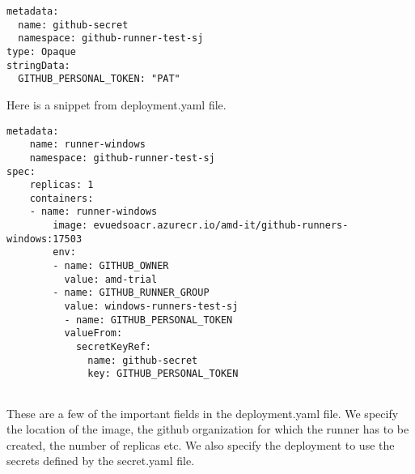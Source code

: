\begin{lstlisting}[breaklines]
metadata:
  name: github-secret
  namespace: github-runner-test-sj
type: Opaque
stringData:
  GITHUB_PERSONAL_TOKEN: "PAT"
\end{lstlisting}

Here is a snippet from deployment.yaml file.
\begin{lstlisting}[breaklines]
metadata:
	name: runner-windows
	namespace: github-runner-test-sj
spec:
	replicas: 1
	containers:
	- name: runner-windows
        image: evuedsoacr.azurecr.io/amd-it/github-runners-windows:17503
        env:
        - name: GITHUB_OWNER
          value: amd-trial
        - name: GITHUB_RUNNER_GROUP
          value: windows-runners-test-sj
          - name: GITHUB_PERSONAL_TOKEN 
          valueFrom:
            secretKeyRef:
              name: github-secret
              key: GITHUB_PERSONAL_TOKEN
	
\end{lstlisting}
These are a few of the important fields in the deployment.yaml file. We specify the location of the image, the github organization for which the runner has to be created, the number of replicas etc.
We also specify the deployment to use the secrets defined by the secret.yaml file.



